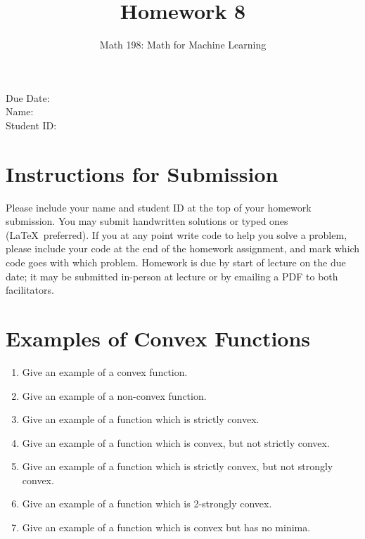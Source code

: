\documentclass{article}
\title{Homework 8}
\author{Math 198: Math for Machine Learning}
\date{}
\begin{document}
\maketitle

\noindent
Due Date:  \\
Name: \\
Student ID:

\section*{Instructions for Submission}
Please include your name and student ID at the top of your homework submission. You may submit handwritten solutions or typed ones (\LaTeX\ preferred). If you at any point write code to help you solve a problem, please include your code at the end of the homework assignment, and mark which code goes with which problem. Homework is due by start of lecture on the due date; it may be submitted in-person at lecture or by emailing a PDF to both facilitators.

\section{Examples of Convex Functions}
\begin{enumerate}[label=\arabic*.]
\item Give an example of a convex function.
\item Give an example of a non-convex function.
\item Give an example of a function which is strictly convex.
\item Give an example of a function which is convex, but not strictly convex.
\item Give an example of a function which is strictly convex, but not strongly convex.
\item Give an example of a function which is 2-strongly convex.
\item Give an example of a function which is convex but has no minima.
\end{enumerate}
\end{document}
